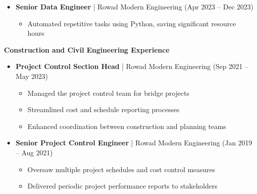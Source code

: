\documentclass[10pt, letterpaper]{article}
\begin{document}
\begin{mdframed}[style=cvframe]
\begin{multicols}{2}
\begin{itemize}[leftmargin=*]
    \item \textbf{Senior Data Engineer} | Rowad Modern Engineering (Apr 2023 -- Dec 2023)
    \begin{itemize}[leftmargin=1cm]
        \item Automated repetitive tasks using Python, saving significant resource hours
    \end{itemize}
\end{itemize}

\textbf{\textcolor{primaryColor}{Construction and Civil Engineering Experience}}
\begin{itemize}[leftmargin=*]
    \item \textbf{Project Control Section Head} | Rowad Modern Engineering (Sep 2021 -- May 2023)
    \begin{itemize}[leftmargin=1cm]
        \item Managed the project control team for bridge projects
        \item Streamlined cost and schedule reporting processes
        \item Enhanced coordination between construction and planning teams
    \end{itemize}
    
    \item \textbf{Senior Project Control Engineer} | Rowad Modern Engineering (Jan 2019 -- Aug 2021)
    \begin{itemize}[leftmargin=1cm]
        \item Oversaw multiple project schedules and cost control measures
        \item Delivered periodic project performance reports to stakeholders
    \end{itemize}
\end{itemize}
\end{multicols}
\end{mdframed}

\clearpage  %
\end{document}
